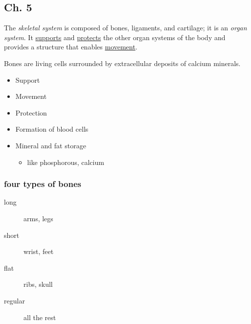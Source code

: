 \documentclass[11pt]{article}
\begin{document}
\subsection{Ch. 5}
\label{sec:orgc7fec7d}
The \emph{skeletal system} is composed of bones, ligaments, and cartilage; it is an
\emph{organ system}. It \uline{supports} and \uline{protects} the other organ systems of the
body and provides a structure that enables \uline{movement}.

Bones are living cells surrounded by extracellular deposits of calcium
minerals. 
\begin{itemize}
\item Support
\item Movement
\item Protection
\item Formation of blood cells
\item Mineral and fat storage
\begin{itemize}
\item like phosphorous, calcium
\end{itemize}
\end{itemize}

\subsubsection{four types of bones}
\label{sec:orge7da9fc}
\begin{description}
\item[{long}] arms, legs
\item[{short}] wrist, feet
\item[{flat}] ribs, skull
\item[{regular}] all the rest
\end{description}
\end{document}
